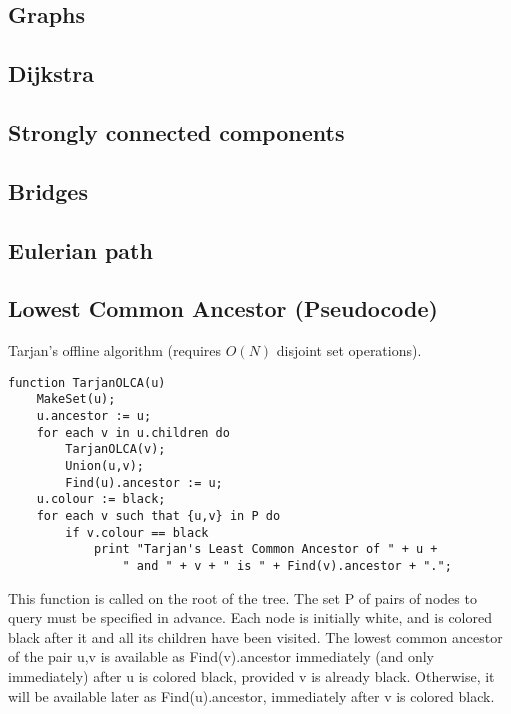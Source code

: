 \documentclass[10pt]{extarticle}
\begin{document}
\begin{multicols*}{3}
\section{Graphs}

\subsection{Dijkstra}


\subsection{Strongly connected components} %


\subsection{Bridges} %


\subsection{Eulerian path} %


\subsection{Lowest Common Ancestor (Pseudocode)} %
Tarjan's offline algorithm (requires $O(N)$ disjoint set operations).
\begin{lstlisting}
function TarjanOLCA(u)
    MakeSet(u);
    u.ancestor := u;
    for each v in u.children do
        TarjanOLCA(v);
        Union(u,v);
        Find(u).ancestor := u;
    u.colour := black;
    for each v such that {u,v} in P do
        if v.colour == black
            print "Tarjan's Least Common Ancestor of " + u +
                " and " + v + " is " + Find(v).ancestor + ".";
\end{lstlisting}
This function is called on the root of the tree. The set P of pairs of nodes to
query must be specified in advance. Each node is initially white, and is
colored black after it and all its children have been visited. The lowest
common ancestor of the pair {u,v} is available as Find(v).ancestor immediately
(and only immediately) after u is colored black, provided v is already black.
Otherwise, it will be available later as Find(u).ancestor, immediately after v
is colored black.


\end{multicols*}
\end{document}
